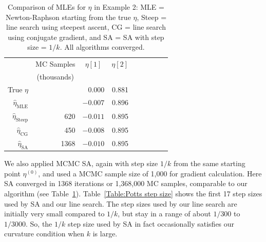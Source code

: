 \begin{table}[h!]
\caption[Comparison of MLEs for $\eta$ in Ising model example]{Comparison of MLEs for $\eta$ in Example 2: MLE = Newton-Raphson starting 
from the true $\eta$, Steep = 
line search using steepest ascent, CG = line search using conjugate gradient, and SA = 
SA with step size = $1/k$.  All 
algorithms converged.}
\begin{center}
\begin{tabular}{rrrrrrlrr}
  \hline
  \multicolumn{1}{c}{} & 
  \multicolumn{1}{c}{MC Samples} &
  \multicolumn{1}{c}{$\eta[1]$} &
  \multicolumn{1}{c}{$\eta[2]$} \\
    &  \multicolumn{1}{c}{(thousands)} &  &  & \\
  \hline
True $\eta$  & & 0.000 & 0.881 \\ 
  $\hat{\eta}_{\textrm{MLE}}$ & & $-0.007$ & 0.896 \\ 
  $\hat{\eta}_{\textrm{Steep}}$ & 620 & $-0.011$ & 0.895 \\ 
  $\hat{\eta}_{\textrm{CG}}$ & 450 & $-0.008$ & 0.895 \\ 
  $\hat{\eta}_{\textrm{SA}}$ & 1368 & $-0.010$ & 0.895 \\ 
   \hline
\end{tabular}
\end{center}
\label{Table:Potts}
\end{table}

We also applied MCMC SA, again with step size $1/k$ from the same starting point $\eta^
{(0)}$, and used
a MCMC sample size of 1,000 for gradient calculation.  
Here SA converged in 1368 iterations or 1,368,000 MC samples, comparable to our 
algorithm (see Table~\ref{Table:Potts}).  Table~\ref{Table:Potts step 
size} shows the first 17 step sizes used by SA and our line search.  The step sizes 
used by our line search are 
initially very small compared to $1/k$, but stay in a range of about $1/300$ to 
$1/3000$.  So, the $1/k$ step size used 
by SA in fact occasionally satisfies our curvature condition when $k$ is large. 

